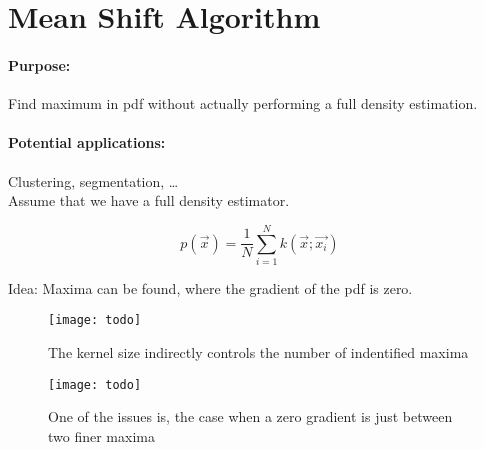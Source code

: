 
\section{Mean Shift Algorithm}

\paragraph{Purpose:}
Find maximum in pdf without actually performing a full density estimation.

\paragraph{Potential applications:}
Clustering, segmentation, \ldots{} \\

Assume that we have a full density estimator.

\begin{equation*}
  p(\vec{x}) = \dfrac{1}{N} \sum_{i=1}^N k(\vec{x}; \vec{x_i})
\end{equation*}

Idea: Maxima can be found, where the gradient of the pdf is zero.

\begin{figure}[H]
  \centering
  \texttt{[image: todo]}
  \caption{The kernel size indirectly controls the number of indentified maxima}
\end{figure}
\begin{figure}[h]
  \centering
  \texttt{[image: todo]}
  \caption{One of the issues is, the case when a zero gradient is just between two finer maxima}
\end{figure}
